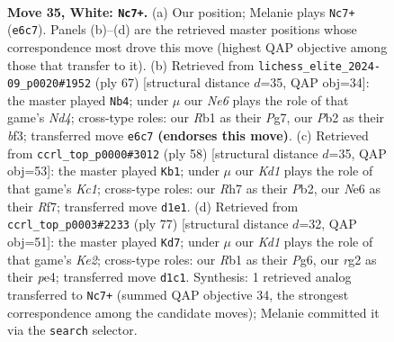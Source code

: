 \documentclass[11pt]{article}
\begin{document}
\clearpage

\begin{figure}[p]\centering
\begin{subfigure}{0.46\textwidth}\centering
\resizebox{\linewidth}{!}{%
\newchessgame
\chessboard[
  setfen={8/pp5R/k3N3/2p2p1P/4p3/8/PP4rr/1R1K4 w - - 1 35},
  showmover=false,
  pgfstyle=straightmove, color=movearrow, markmove={e6-c7}
]}
\caption{}
\end{subfigure}\hfill
\begin{subfigure}{0.46\textwidth}\centering
\resizebox{\linewidth}{!}{%
\newchessgame
\chessboard[
  setfen={8/2r2kpp/8/3n4/5P2/2p2BPK/1r5P/2R1R3 b - - 2 34},
  showmover=false,
  pgfstyle=straightmove, color=movearrow, markmove={d5-b4}
]}
\caption{}
\end{subfigure}
\\[4pt]
\begin{subfigure}{0.46\textwidth}\centering
\resizebox{\linewidth}{!}{%
\newchessgame
\chessboard[
  setfen={2r4k/5R1p/p6P/1p3p2/8/8/PPP2r2/2K4R w - - 1 30},
  showmover=false,
  pgfstyle=straightmove, color=movearrow, markmove={c1-b1}
]}
\caption{}
\end{subfigure}\hfill
\begin{subfigure}{0.46\textwidth}\centering
\resizebox{\linewidth}{!}{%
\newchessgame
\chessboard[
  setfen={8/2r1k3/R1p3pp/6p1/4P3/7P/P2r2P1/2R3K1 b - - 4 39},
  showmover=false,
  pgfstyle=straightmove, color=movearrow, markmove={e7-d7}
]}
\caption{}
\end{subfigure}
\caption{\textbf{Move 35, White: \texttt{Nc7+}.} (a) Our position; Melanie plays \texttt{Nc7+} (\texttt{e6c7}). Panels (b)--(d) are the retrieved master positions whose correspondence most drove this move (highest QAP objective among those that transfer to it). (b) Retrieved from \texttt{lichess\_elite\_2024-09\_p0020\#1952} (ply 67) [structural distance $d$=35, QAP obj=34]: the master played \texttt{Nb4}; under $\mu$ our \emph{Ne6} plays the role of that game's \emph{Nd4}; cross-type roles: our \emph{R}b1 as their \emph{P}g7, our \emph{P}b2 as their \emph{b}f3; transferred move \texttt{e6c7} \textbf{(endorses this move)}. (c) Retrieved from \texttt{ccrl\_top\_p0000\#3012} (ply 58) [structural distance $d$=35, QAP obj=53]: the master played \texttt{Kb1}; under $\mu$ our \emph{Kd1} plays the role of that game's \emph{Kc1}; cross-type roles: our \emph{R}h7 as their \emph{P}b2, our \emph{N}e6 as their \emph{R}f7; transferred move \texttt{d1e1}. (d) Retrieved from \texttt{ccrl\_top\_p0003\#2233} (ply 77) [structural distance $d$=32, QAP obj=51]: the master played \texttt{Kd7}; under $\mu$ our \emph{Kd1} plays the role of that game's \emph{Ke2}; cross-type roles: our \emph{R}b1 as their \emph{P}g6, our \emph{r}g2 as their \emph{p}e4; transferred move \texttt{d1c1}. Synthesis: 1 retrieved analog transferred to \texttt{Nc7+} (summed QAP objective 34, the strongest correspondence among the candidate moves); Melanie committed it via the \texttt{search} selector.}
\label{fig:thought-m68}
\end{figure}
\end{document}
